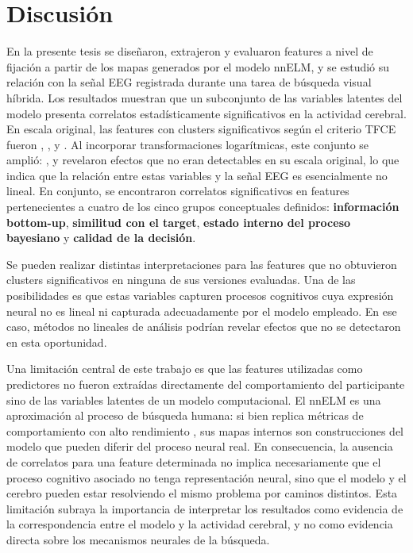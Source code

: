 \chapter{Discusión}
\label{ch:discusion}


En la presente tesis se diseñaron, extrajeron y evaluaron features a nivel de fijación a partir de los mapas generados por el modelo nnELM, y se estudió su relación con la señal EEG registrada durante una tarea de búsqueda visual híbrida. Los resultados muestran que un subconjunto de las variables latentes del modelo presenta correlatos estadísticamente significativos en la actividad cerebral. En escala original, las features con clusters significativos según el criterio TFCE fueron , ,  y . Al incorporar transformaciones logarítmicas, este conjunto se amplió: ,  y  revelaron efectos que no eran detectables en su escala original, lo que indica que la relación entre estas variables y la señal EEG es esencialmente no lineal. En conjunto, se encontraron correlatos significativos en features pertenecientes a cuatro de los cinco grupos conceptuales definidos: \textbf{información bottom-up}, \textbf{similitud con el target}, \textbf{estado interno del proceso bayesiano} y \textbf{calidad de la decisión}.

Se pueden realizar distintas interpretaciones para las features que no obtuvieron clusters significativos en ninguna de sus versiones evaluadas. Una de las posibilidades es que estas variables capturen procesos cognitivos cuya expresión neural no es lineal ni capturada adecuadamente por el modelo empleado. En ese caso, métodos no lineales de análisis podrían revelar efectos que no se detectaron en esta oportunidad. 


Una limitación central de este trabajo es que las features utilizadas como predictores no fueron extraídas directamente del comportamiento del participante sino de las variables latentes de un modelo computacional. El nnELM es una aproximación al proceso de búsqueda humana: si bien replica métricas de comportamiento con alto rendimiento \citep{ruarte2025}, sus mapas internos son construcciones del modelo que pueden diferir del proceso neural real. En consecuencia, la ausencia de correlatos para una feature determinada no implica necesariamente que el proceso cognitivo asociado no tenga representación neural, sino que el modelo y el cerebro pueden estar resolviendo el mismo problema por caminos distintos. Esta limitación subraya la importancia de interpretar los resultados como evidencia de la correspondencia entre el modelo y la actividad cerebral, y no como evidencia directa sobre los mecanismos neurales de la búsqueda.

